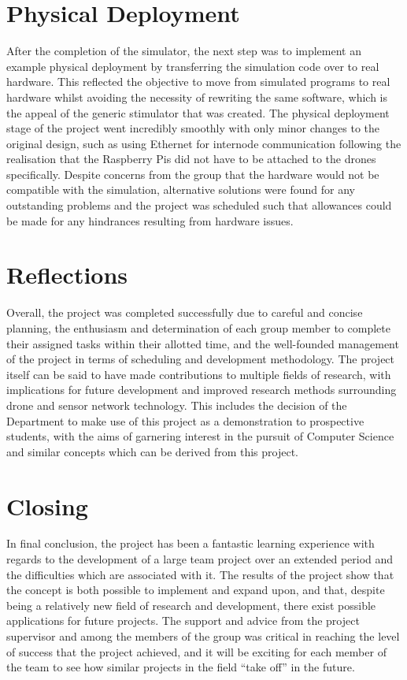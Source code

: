 \section{Physical Deployment}
After the completion of the simulator, the next step was to implement an example physical deployment by transferring the simulation code over to real hardware. This reflected the objective to move from simulated programs to real hardware whilst avoiding the necessity of rewriting the same software, which is the appeal of the generic stimulator that was created. The physical deployment stage of the project went incredibly smoothly with only minor changes to the original design, such as using Ethernet for internode communication following the realisation that the Raspberry Pis did not have to be attached to the drones specifically. Despite concerns from the group that the hardware would not be compatible with the simulation, alternative solutions were found for any outstanding problems and the project was scheduled such that allowances could be made for any hindrances resulting from hardware issues.

\section{Reflections}
Overall, the project was completed successfully due to careful and concise planning, the enthusiasm and determination of each group member to complete their assigned tasks within their allotted time, and the well-founded management of the project in terms of scheduling and development methodology. The project itself can be said to have made contributions to multiple fields of research, with implications for future development and improved research methods surrounding drone and sensor network technology. This includes the decision of the Department to make use of this project as a demonstration to prospective students, with the aims of garnering interest in the pursuit of Computer Science and similar concepts which can be derived from this project.

\section{Closing}
In final conclusion, the project has been a fantastic learning experience with regards to the development of a large team project over an extended period and the difficulties which are associated with it. The results of the project show that the concept is both possible to implement and expand upon, and that, despite being a relatively new field of research and development, there exist possible applications for future projects. The support and advice from the project supervisor and among the members of the group was critical in reaching the level of success that the project achieved, and it will be exciting for each member of the team to see how similar projects in the field ``take off'' in the future.
